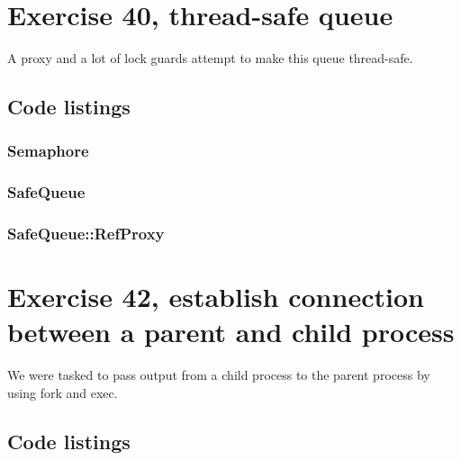 \documentclass[11pt]{article}
\begin{document}
\section*{Exercise 40, thread-safe queue}
A proxy and a lot of lock guards attempt to make this queue thread-safe.

\subsection*{Code listings}



\subsubsection*{Semaphore}






\subsubsection*{SafeQueue}






\subsubsection*{SafeQueue::RefProxy}





\section*{Exercise 42, establish connection between a parent and child process}
We were tasked to pass output from a child process to the parent process by using fork and exec.

\subsection*{Code listings}



\end{document}
